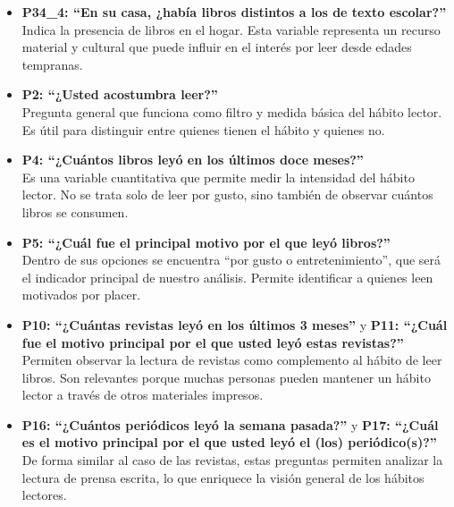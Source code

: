 \documentclass[aps,reprint]{revtex4-2}
\begin{document}
\begin{itemize}
    \item \textbf{P34\_4: “En su casa, ¿había libros distintos a los de texto escolar?”} \\
    Indica la presencia de libros en el hogar. Esta variable representa un recurso material y cultural que puede influir en el interés por leer desde edades tempranas.
    
    \item \textbf{P2: “¿Usted acostumbra leer?”} \\
    Pregunta general que funciona como filtro y medida básica del hábito lector. Es útil para distinguir entre quienes tienen el hábito y quienes no.
    
    \item \textbf{P4: “¿Cuántos libros leyó en los últimos doce meses?”} \\
    Es una variable cuantitativa que permite medir la intensidad del hábito lector. No se trata solo de leer por gusto, sino también de observar cuántos libros se consumen.
    
    \item \textbf{P5: “¿Cuál fue el principal motivo por el que leyó libros?”} \\
    Dentro de sus opciones se encuentra “por gusto o entretenimiento”, que será el indicador principal de nuestro análisis. Permite identificar a quienes leen motivados por placer.
    
    \item \textbf{P10: “¿Cuántas revistas leyó en los últimos 3 meses”} y \textbf{P11: “¿Cuál fue el motivo principal por el que usted leyó estas revistas?”} \\
    Permiten observar la lectura de revistas como complemento al hábito de leer libros. Son relevantes porque muchas personas pueden mantener un hábito lector a través de otros materiales impresos.
    
    \item \textbf{P16: “¿Cuántos periódicos leyó la semana pasada?”} y \textbf{P17: “¿Cuál es el motivo principal por el que usted leyó el (los) periódico(s)?”} \\
    De forma similar al caso de las revistas, estas preguntas permiten analizar la lectura de prensa escrita, lo que enriquece la visión general de los hábitos lectores.
\end{itemize}
\end{document}

